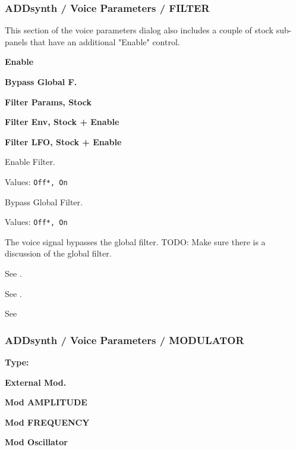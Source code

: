 \subsubsection{ADDsynth / Voice Parameters / FILTER}
\label{subsubsec:addsynth_voice_parameters_filter}

   This section of the voice parameters dialog also includes a couple of
   stock sub-panels that have an additional "Enable" control.

   \begin{enumber}
      \item \textbf{Enable}
      \item \textbf{Bypass Global F.}
      \item \textbf{Filter Params, Stock}
      \item \textbf{Filter Env, Stock + Enable}
      \item \textbf{Filter LFO, Stock + Enable}
   \end{enumber}

   \setcounter{ItemCounter}{0}      %

   Enable Filter.

   Values: \texttt{Off*, On}

   Bypass Global Filter.

   Values: \texttt{Off*, On}

   The voice signal bypasses the global filter.
   TODO:  Make sure there is a discussion of the global filter.

   See
   .

   See
   .

   See

\subsubsection{ADDsynth / Voice Parameters / MODULATOR}
\label{subsubsec:addsynth_voice_parameters_modulator}

   \begin{enumber}
      \item \textbf{Type:}
      \item \textbf{External Mod.}
      \item \textbf{Mod AMPLITUDE}
      \item \textbf{Mod FREQUENCY}
      \item \textbf{Mod Oscillator}
   \end{enumber}


